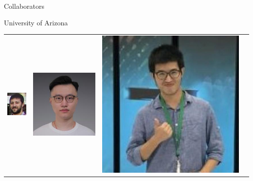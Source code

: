 \documentclass[14pt]{beamer}
\begin{document}
\begin{frame}{Collaborators}
\centering

\begin{block}{University of Arizona}
\begin{tabular}{c c c c }
\includegraphics[height=0.2\textheight]{Egoitz.jpg} &
\includegraphics[height=0.2\textheight]{Xin.jpg} &
\includegraphics[height=0.2\textheight]{Dongfang.jpg} &

\end{tabular}
\end{block}
\end{frame}
\end{document}
